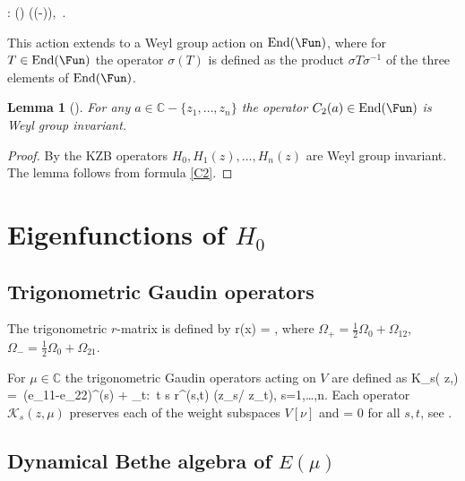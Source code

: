 \documentclass[12pt]{amsart}
\newtheorem{lem}[thm]{Lemma}
\numberwithin{equation}{section}
\theoremstyle{definition}
\let\mc\mathcal
\let\la\lambda
\let\si\sigma
\let\Om\Omega
\let\on\operatorname
\def\C{{\mathbb C}}
\def\K{{\mc K}}
\def\End{\on{End}}
\begin{document}
\bean
\label{siF}
\si : \psi(\la) \mapsto \si (\psi (-\la)), \qquad
\psi \in\Fun\,.
\eean

\smallskip
\noindent
This action extends to a Weyl group action on
 $\End(\Fun)$, where for  
$T \in \End(\Fun)$ the operator $\si(T)$ is defined as the product 
$\si T\si^{-1}$ of the three elements of $\End(\Fun)$.


\begin{lem} [\cite{ThV}]
\label{weyl inv}
For any  $a\in \C-\{z_1,\dots,z_n\}$ the operator $C_2(a) \in \End(\Fun)$ is Weyl group invariant.
\end{lem}



\begin{proof}
By \cite{FW} the KZB operators  $H_0,H_1(z),\dots,H_n(z)$ are Weyl group invariant.
The lemma  follows from formula \eqref{C2}.
\end{proof}








\section{Eigenfunctions of $H_0$}
\label{sec 3}



\subsection{Trigonometric Gaudin operators}

The trigonometric $r$-matrix is defined by 
\bean
\label{r-matrix}
r(x) = \frac{\Om_+ x + \Om_-}{x-1},
\eean
where
$\Om_+ = \frac12 \Om_0 + \Om_{12}$,\ $\Om_- = \frac12 \Om_0 + \Om_{21}$.





For $\mu \in \C$ the trigonometric Gaudin operators acting on $V$ are defined as 
\bean
\label{trig Gaudin} 
\K_s( z,\mu) = \,(e_{11}-e_{22})^{(s)} + \sum_{t:\, t \ne s} r^{(s,t)} (z_s/ z_t), \qquad s=1,\dots,n.
\eean
 Each operator $\K_s(z,\mu)$ preserves each of  the weight subspaces $V[\nu]$
and
 \bea
 [\K_s(z,\mu), \K_t( z,\mu)] = 0
 \eea
  for all $s,t$, see \cite{Ch, EFK}.


\subsection{Dynamical Bethe algebra of  $E(\mu)$} 
\label{sec BE}
\end{document}
